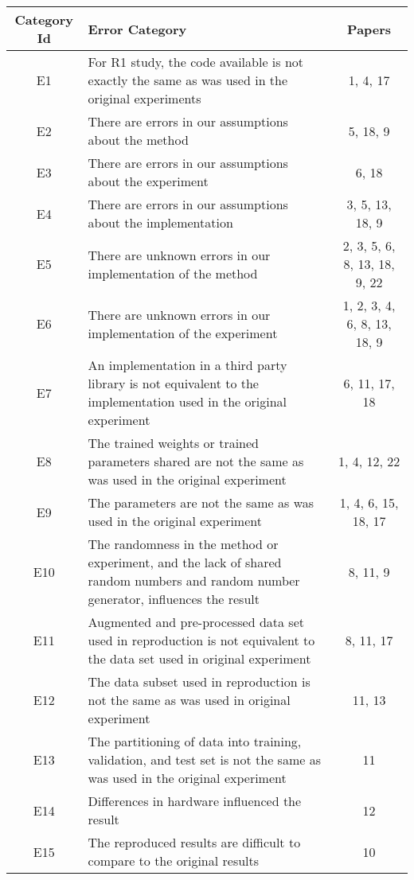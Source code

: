 \begin{tabularx}{\textwidth}{cXc}
\toprule
Category Id &                                                                                                                        Error Category &                        Papers \\
\midrule
 E1 &  For R1 study, the code available is not exactly the same as was used in the original experiments &  1, 4, 17 \\
 E2 &  There are errors in our assumptions about the method &  5, 18, 9 \\
 E3 &  There are errors in our assumptions about the experiment &  6, 18 \\
 E4 &  There are errors in our assumptions about the implementation &  3, 5, 13, 18, 9 \\
 E5 &  There are unknown errors in our implementation of the method &  2, 3, 5, 6, 8, 13, 18, 9, 22 \\
 E6 &  There are unknown errors in our implementation of the experiment &  1, 2, 3, 4, 6, 8, 13, 18, 9 \\
 E7 &  An implementation in a third party library is not equivalent to the implementation used in the original experiment &  6, 11, 17, 18 \\
 E8 &  The trained weights or trained parameters shared are not the same as was used in the original experiment &  1, 4, 12, 22 \\
 E9 &  The parameters are not the same as was used in the original experiment &  1, 4, 6, 15, 18, 17 \\
 E10 &  The randomness in the method or experiment, and the lack of shared random numbers and random number generator, influences the result &  8, 11, 9 \\
 E11 &  Augmented and pre-processed data set used in reproduction is not equivalent to the data set used in original experiment &  8, 11, 17 \\
 E12 &  The data subset used in reproduction is not the same as was used in original experiment &  11, 13 \\
 E13 &  The partitioning of data into training, validation, and test set is not the same as was used in the original experiment &  11 \\
 E14 &  Differences in hardware influenced the result &  12 \\
 E15 &  The reproduced results are difficult to compare to the original results &  10 \\
\bottomrule
\end{tabularx}
